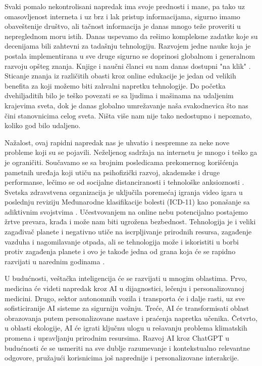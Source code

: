 \documentclass[a4paper]{article}
\begin{document}
{Svaki pomalo nekontrolisani napredak ima svoje prednosti i mane, pa tako uz omasovljenost interneta i uz brz i lak pristup informacijama, sigurno imamo obaveštenije društvo, ali tačnost informacija je danas mnogo teže proveriti u nepreglednom moru istih. Danas uspevamo da rešimo kompleksne zadatke koje su decenijama bili zahtevni za tadašnju tehnologiju. Razvojem jedne nauke koja je postala implementirana u sve druge sigurno se doprinosi globalnom i generalnom razvoju opšteg znanja. Knjige i naučni članci su nam danas dostupni "na klik" . 
Sticanje znanja iz različitih obasti kroz online edukacije je jedan od velikih benefita za koji možemo biti zahvalni napretku tehnologije.  
Do početka dvehiljaditih bilo je teško povezati se sa ljudima i mašinama na udaljenim krajevima sveta, dok je danas globalno umrežavanje naša svakodnevica što nas čini stanovnicima celog sveta. Ništa više nam nije tako nedostupno i nepoznato, koliko god bilo udaljeno.


Nažalost, ovaj rapidni napredak nas je uhvatio i nespremne za neke nove probleme koji su se pojavili. Neželjenog sadržaja na internetu je mnogo i teško ga je ograničiti. Součavamo se sa brojnim posledicama prekomernog korišćenja pametnih uređaja koji utiču na psihofizički razvoj, akademske i druge performanse, lečimo se od socijalne distanciranosti i tehnološke anksioznosti \cite{techanx}. Svetska zdravstvena organizacija je uključila poremećaj igranja video igara u poslednju reviziju Međunarodne klasifikacije bolesti (ICD-11) kao ponašanje sa adiktivnim svojstvima \cite{gamingdisorder}. 
Učestvovanjem na online nebu potencijalno postajemo žrtve prevara, krađa i može nam biti ugrožena bezbednost. Tehnologija je i veliki zagađivač planete i negativno utiče na iscrpljivanje prirodnih resursa, zagađenje vazduha i nagomilavanje otpada, ali se tehnologija može i iskoristiti u borbi protiv zagađenja planete i ovo je takođe jedna od grana koja će se rapidno razvijati u narednim godinama \cite{pollution}.



U budućnosti, veštačka inteligencija će se razvijati u mnogim oblastima. Prvo, medicina će videti napredak kroz AI u dijagnostici, lečenju i personalizovanoj medicini. Drugo, sektor autonomnih vozila i transporta će i dalje rasti, uz sve sofisticiranije AI sisteme za sigurniju vožnju. Treće, AI će transformisati oblast obrazovanja putem personalizovane nastave i praćenja napretka učenika. Četvrto, u oblasti ekologije, AI će igrati ključnu ulogu u rešavanju problema klimatskih promena i upravljanju prirodnim resursima. Razvoj AI kroz ChatGPT u budućnosti će se usmeriti na sve dublje razumevanje i kontekstualno relevantne odgovore, pružajući korisnicima još naprednije i personalizovane interakcije.

}
\end{document}
